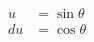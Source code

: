 \documentclass[preview]{standalone}
\begin{document}
\begin{align*}
u&=\sin\theta \\ du&=\cos\theta
\end{align*}
\end{document}
